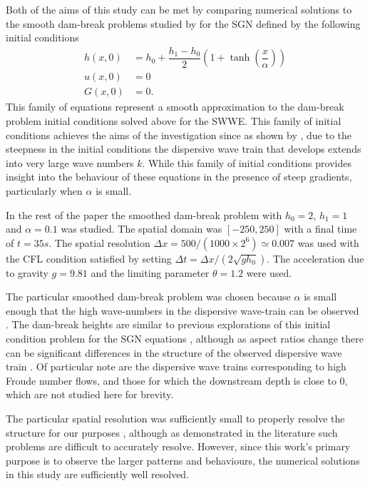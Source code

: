 \documentclass[10pt]{elsarticle}
\begin{document}
Both of the aims of this study can be met by comparing numerical solutions to the smooth dam-break problems studied by \citet{Pitt-2018-61} for the SGN defined by the following initial conditions 
\begin{align}
h(x,0) & = h_0 + \dfrac{h_1 - h_0}{2} \left(1 + \tanh\left(\dfrac{x}{\alpha}\right)\right)  \\
u(x,0) &= 0 \\
G(x,0) &= 0.
\end{align}
This family of equations represent a smooth approximation to the dam-break problem initial conditions solved above for the SWWE. This family of initial conditions achieves the aims of the investigation since as shown by \citet{Pitt-2018-61}, due to the steepness in the initial conditions the dispersive wave train that develops extends into very large wave numbers $k$. While this family of initial conditions provides insight into the behaviour of these equations in the presence of steep gradients, particularly when $\alpha$ is small. 

In the rest of the paper the smoothed dam-break problem with $h_0=2$, $h_1 = 1$ and $\alpha = 0.1$ was studied. The spatial domain was $\left[-250,250\right]$ with a final time of $t=35s$. The spatial resolution $\Delta x = 500 / (1000 \times 2^{6}) \simeq 0.007$ was used with the CFL condition satisfied by setting $\Delta t = \Delta x / \left(2 \sqrt{g h_0}\right)$. The acceleration due to gravity $g = 9.81$ and the limiting parameter $\theta = 1.2$ were used.

The particular smoothed dam-break problem was chosen because $\alpha$ is small enough that the high wave-numbers in the dispersive wave-train can be observed \cite{Pitt-2018-61}. The dam-break heights are similar to previous explorations of this initial condition problem for the SGN equations \cite{Clamond-Dutykh-2018-237,Pitt-2018-61,Hank-etal-2010-2034}, although as aspect ratios change there can be significant differences in the structure of the observed dispersive wave train \cite{Zoppou-2014}. Of particular note are the dispersive wave trains corresponding to high Froude number flows, and those for which the downstream depth is close to $0$, which are not studied here for brevity. 

The particular spatial resolution was sufficiently small to properly resolve the structure for our purposes \cite{Pitt-2018-61}, although as demonstrated in the literature such problems are difficult to accurately resolve. However, since this work's primary purpose is to observe the larger patterns and behaviours, the numerical solutions in this study are sufficiently well resolved. 
\end{document}
